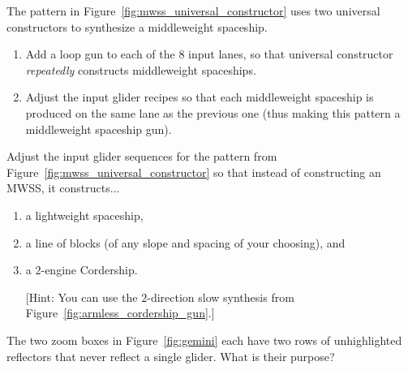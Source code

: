 \begin{multicols}{2}
	
	\mfilbreak
	
	
	\begin{problem}\label{exer:mwss_universal_constructor_turn_into_gun} 
		The pattern in Figure~\ref{fig:mwss_universal_constructor} uses two universal constructors to synthesize a middleweight spaceship.\smallskip
		
		\begin{enumerate}[label=\bf\color{ocre}(\alph*)]
			\item Add a loop gun to each of the 8 input lanes, so that universal constructor \emph{repeatedly} constructs middleweight spaceships.
			
			\item Adjust the input glider recipes so that each middleweight spaceship is produced on the same lane as the previous one (thus making this pattern a middleweight spaceship gun).
		\end{enumerate}
	\end{problem}
	
	
	\mfilbreak
	
	
	\begin{problem}\label{exer:mwss_universal_constructor_turn_into_other}
		Adjust the input glider sequences for the pattern from Figure~\ref{fig:mwss_universal_constructor} so that instead of constructing an MWSS, it constructs...\smallskip
		
		\begin{enumerate}[label=\bf\color{ocre}(\alph*)]
			\item {} a lightweight spaceship,
			
			\item {} a line of blocks (of any slope and spacing of your choosing), and
			
			\item {} a $2$-engine Cordership.
			
			[Hint: You can use the $2$-direction slow synthesis from Figure~\ref{fig:armless_cordership_gun}.]
		\end{enumerate}
	\end{problem}
	
	
	\mfilbreak
	
	
	\begin{problemstar}\label{exer:gemini_unhighlighted_reflectors} 
		The two zoom boxes in Figure~\ref{fig:gemini} each have two rows of unhighlighted reflectors that never reflect a single glider. What is their purpose?
	\end{problemstar}
	

\end{multicols}

